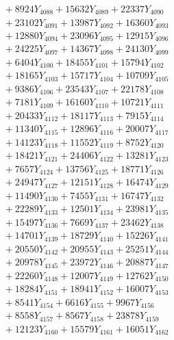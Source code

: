 \documentclass[a4paper,10pt]{article}
\begin{document}
{\begin{align}
&\;  + 8924 Y_{4088} + 15632 Y_{4089} + 22337 Y_{4090} \\[0.3ex]
&\;  + 23102 Y_{4091} + 13987 Y_{4092} + 16360 Y_{4093} \\[0.3ex]
&\;  + 12880 Y_{4094} + 23096 Y_{4095} + 12915 Y_{4096} \\[0.3ex]
&\;  + 24225 Y_{4097} + 14367 Y_{4098} + 24130 Y_{4099} \\[0.3ex]
&\;  + 6404 Y_{4100} + 18455 Y_{4101} + 15794 Y_{4102} \\[0.3ex]
&\;  + 18165 Y_{4103} + 15717 Y_{4104} + 10709 Y_{4105} \\[0.3ex]
&\;  + 9386 Y_{4106} + 23543 Y_{4107} + 22178 Y_{4108} \\[0.5ex]\allowbreak
&\;  + 7181 Y_{4109} + 16160 Y_{4110} + 10721 Y_{4111} \\[0.3ex]
&\;  + 20433 Y_{4112} + 18117 Y_{4113} + 7915 Y_{4114} \\[0.3ex]
&\;  + 11340 Y_{4115} + 12896 Y_{4116} + 20007 Y_{4117} \\[0.3ex]
&\;  + 14123 Y_{4118} + 11552 Y_{4119} + 8752 Y_{4120} \\[0.3ex]
&\;  + 18421 Y_{4121} + 24406 Y_{4122} + 13281 Y_{4123} \\[0.3ex]
&\;  + 7657 Y_{4124} + 13756 Y_{4125} + 18771 Y_{4126} \\[0.3ex]
&\;  + 24947 Y_{4127} + 12151 Y_{4128} + 16474 Y_{4129} \\[0.3ex]
&\;  + 11490 Y_{4130} + 7455 Y_{4131} + 16747 Y_{4132} \\[0.3ex]
&\;  + 22289 Y_{4133} + 12501 Y_{4134} + 23981 Y_{4135} \\[0.3ex]
&\;  + 15497 Y_{4136} + 7669 Y_{4137} + 23462 Y_{4138} \\[0.5ex]\allowbreak
&\;  + 14701 Y_{4139} + 18729 Y_{4140} + 15226 Y_{4141} \\[0.3ex]
&\;  + 20550 Y_{4142} + 20955 Y_{4143} + 25251 Y_{4144} \\[0.3ex]
&\;  + 20978 Y_{4145} + 23972 Y_{4146} + 20887 Y_{4147} \\[0.3ex]
&\;  + 22260 Y_{4148} + 12007 Y_{4149} + 12762 Y_{4150} \\[0.3ex]
&\;  + 18284 Y_{4151} + 18941 Y_{4152} + 16007 Y_{4153} \\[0.3ex]
&\;  + 8541 Y_{4154} + 6616 Y_{4155} + 9967 Y_{4156} \\[0.3ex]
&\;  + 8558 Y_{4157} + 8567 Y_{4158} + 23878 Y_{4159} \\[0.3ex]
&\;  + 12123 Y_{4160} + 15579 Y_{4161} + 16051 Y_{4162} \\[0.3ex]

\end{align}}
\end{document}
